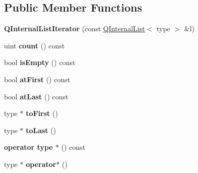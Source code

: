 \subsection*{Public Member Functions}
\begin{DoxyCompactItemize}
\item 
\mbox{\label{class_q_internal_list_iterator_adc856ef0e420d1571641b243cebd288e}} 
{\bfseries Q\+Internal\+List\+Iterator} (const \mbox{\hyperlink{class_q_internal_list}{Q\+Internal\+List}}$<$ type $>$ \&l)
\item 
\mbox{\label{class_q_internal_list_iterator_a340a9160b8cda72f9e48c4e9839210b7}} 
uint {\bfseries count} () const
\item 
\mbox{\label{class_q_internal_list_iterator_ad02bd3cc26a1290b409104e9dfe22644}} 
bool {\bfseries is\+Empty} () const
\item 
\mbox{\label{class_q_internal_list_iterator_ab23799a9a0208453312f10bc9d41970b}} 
bool {\bfseries at\+First} () const
\item 
\mbox{\label{class_q_internal_list_iterator_adbd5e31e14d41267cc35e316edbc5828}} 
bool {\bfseries at\+Last} () const
\item 
\mbox{\label{class_q_internal_list_iterator_af7acae988506f9cba49a5d17c40c682c}} 
type $\ast$ {\bfseries to\+First} ()
\item 
\mbox{\label{class_q_internal_list_iterator_a2042a5c5b6c0f470e97aafe06024d1c2}} 
type $\ast$ {\bfseries to\+Last} ()
\item 
\mbox{\label{class_q_internal_list_iterator_adb231f8ae901b5a1f44589f4d21ab889}} 
{\bfseries operator type $\ast$} () const
\item 
\mbox{\label{class_q_internal_list_iterator_a0499c3f698f8151fc8662aef91c380cd}} 
type $\ast$ {\bfseries operator$\ast$} ()
\item 
\mbox{\label{class_q_internal_list_iterator_a08434872aa2f95ec697459a85f3b0ce9}} 

\end{DoxyCompactItemize}
